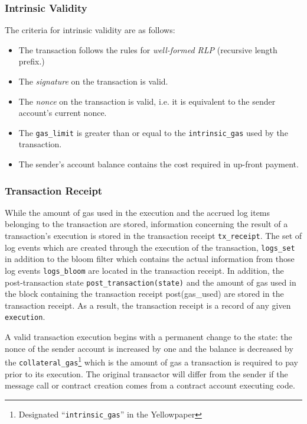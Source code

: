 \documentclass[10pt,letterpaper,leqno,bibliography=totoc]{scrartcl}
\newenvironment{alphafootnotes}
{\par\edef\savedfootnotenumber{\number\value{footnote}}
\renewcommand{\thefootnote}{\alph{footnote}}
\setcounter{footnote}{0}}
{\par\setcounter{footnote}{\savedfootnotenumber}}
\begin{document}
\begin{alphafootnotes}
\begin{multicols*}{2}
			\subsubsection{Intrinsic Validity}
				The criteria for intrinsic validity are as follows:
				\begin{itemize}
				\item The transaction follows the rules for \textsl{well-formed RLP} (recursive length prefix.)
				\item The \textsl{signature} on the transaction is valid.
				\item The \textsl{nonce} on the transaction is valid, i.e. it is equivalent to the sender account's current nonce.
				\item The \texttt{gas\_limit} is greater than or equal to the \texttt{intrinsic\_gas} used by the transaction.
				\item The sender's account balance contains the cost required in up-front payment.
				\end{itemize}

			\subsubsection{Transaction Receipt}
				While the amount of gas used in the execution and the accrued log items belonging to the transaction are stored, information concerning the result of a transaction's execution is stored in the transaction receipt \texttt{tx\_receipt}. The set of log events which are created through the execution of the transaction, \texttt{logs\_set} in addition to the bloom filter which contains the actual information from those log events \texttt{logs\_bloom} are located in the transaction receipt. In addition, the post-transaction state \texttt{post\_transaction(state)} and the amount of gas used in the block containing the transaction receipt post(gas\_used) are stored in the transaction receipt. As a result, the transaction receipt is a record of any given \texttt{execution}.
					
					A valid transaction execution begins with a permanent change to the state: the nonce of the sender account is increased by one and the balance is decreased by the \texttt{collateral\_gas}\footnote{Designated ``\texttt{intrinsic\_gas}'' in the Yellowpaper} which is the amount of gas a transaction is required to pay prior to its execution. The original transactor will differ from the sender if the message call or contract creation comes from a contract account executing code. 
			

\end{multicols*}
\end{alphafootnotes}
\end{document}
